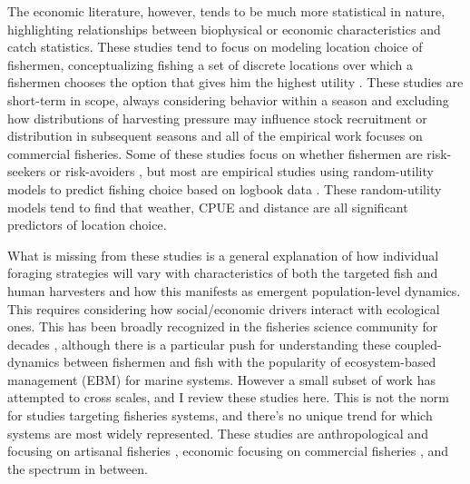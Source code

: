\documentclass[12pt,a4paper]{report}
\begin{document}
The economic literature, however, tends to be much more statistical in nature, highlighting relationships between biophysical or economic characteristics and catch statistics. These studies tend to focus on modeling location choice of fishermen, conceptualizing fishing a set of discrete locations over which a fishermen chooses the option that gives him the highest utility \citep{Smith:2000}. These studies are short-term in scope, always considering behavior within a season and excluding how distributions of harvesting pressure may influence stock recruitment or distribution in subsequent seasons and all of the empirical work focuses on commercial fisheries. Some of these studies focus on whether fishermen are risk-seekers or risk-avoiders \citep{MistiaenStrand:2000}, but most are empirical studies using random-utility models to predict fishing choice based on logbook data \citep{BockstaelOpaluch:1983, EalesWilen:1986, Huttonetal:2004, Salasetal:2004, CurtisMcConnell:2004, EggertTveteras:2004, Vermardetal:2008, Andersenetal:2012, Marchaletal:2009, Valcic:2009, Eisenacketal:2006, Dupontetal:1993}. These random-utility models tend to find that weather, CPUE and distance are all significant predictors of location choice. 

What is missing from these studies is a general explanation of how individual foraging strategies will vary with characteristics of both the targeted fish and human harvesters and how this manifests as emergent population-level dynamics. This requires considering how social/economic drivers interact with ecological ones. This has been broadly recognized in the fisheries science community for decades \citep{Smith:2000, Graftonetal:2006, Arlinghausetal:2013, Fultonetal:2011, vanPuttenetal:2011, HayniePfeiffer:2012, DegnbolMcCay:2007, Hilborn:2007, Branchetal:2006, Hilbornetal:2005, Salasetal:2004, Wilenetal:2002}, although there is a particular push for understanding these coupled-dynamics between fishermen and fish with the popularity of ecosystem-based management (EBM) for marine systems. However a small subset of work has attempted to cross scales, and I review these studies here.  This is not the norm for studies targeting fisheries systems, and there's no unique trend for which systems are most widely represented. These studies are anthropological and focusing on artisanal fisheries \citep{BasurtoL2005, Basurto:2008}, economic focusing on commercial fisheries \citep{Smithetal:2008, SmithWilen:2003}, and the spectrum in between. 
\end{document}
